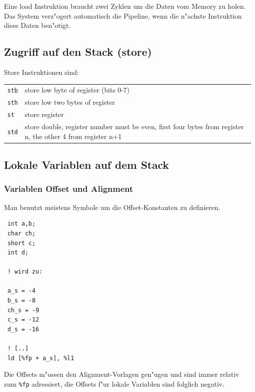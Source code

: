 \documentclass[german, 10pt, a4paper, twocolumn]{scrartcl}
\begin{document}
Eine load Instruktion braucht zwei Zyklen um die Daten vom Memory zu holen. Das System verz"ogert automatisch die Pipeline, wenn die n"achste Instruktion diese Daten ben"otigt.

\subsection{Zugriff auf den Stack (store)}

Store Instruktionen sind:\\
\begin{tabular}{lp{6.5cm}}
	\verb#stb# &		store low byte of register (bits 0-7)\\
	\verb#sth# &		store low two bytes of register\\
	\verb#st# &		store register\\
	\verb#std# &		store double, register number must be even, first four bytes from register n, the other 4 from register n+1
\end{tabular}

\subsection{Lokale Variablen auf dem Stack}

\subsubsection{Variablen Offset und Alignment}

Man benutzt meistens Symbole um die Offset-Konstanten zu definieren.
\begin{verbatim}
 int a,b;
 char ch;
 short c;
 int d;

 ! wird zu:

 a_s = -4
 b_s = -8
 ch_s = -9
 c_s = -12
 d_s = -16

 ! [..]
 ld [%fp + a_s], %l1
\end{verbatim}

Die Offsets m"ussen den Alignment-Vorlagen gen"ugen und sind immer relativ zum \verb#%fp# adressiert, die Offsets f"ur lokale Variablen sind folglich negativ.
\end{document}
